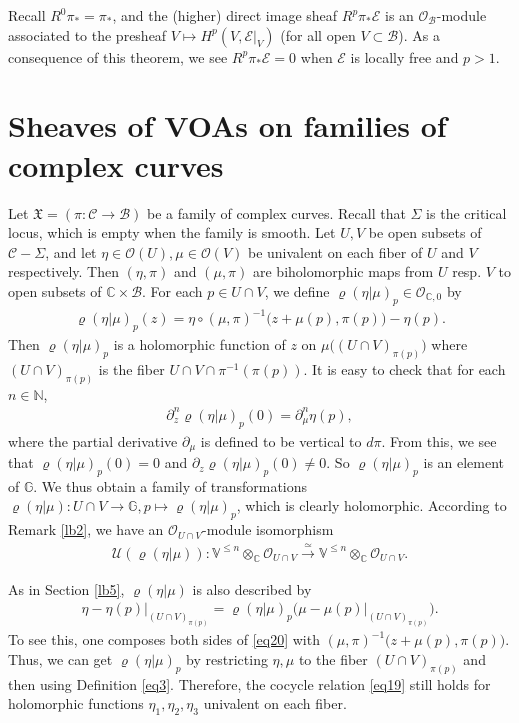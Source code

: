 \documentclass[11pt,b5paper,notitlepage]{article}
\theoremstyle{definition}
\theoremstyle{plain}
\newcommand{\fk}{\mathfrak}
\newcommand{\mc}{\mathcal}
\newcommand{\scr}{\mathscr}
\newcommand{\Vbb}{\mathbb V}
\newcommand{\Gbb}{\mathbb G}
\newcommand{\Cbb}{\mathbb C}
\newcommand{\Nbb}{\mathbb N}
\numberwithin{equation}{section}
\begin{document}
Recall  $R^0\pi_*=\pi_*$, and the (higher) direct image sheaf $R^p\pi_*\scr E$ is an $\scr O_{\mc B}$-module associated to the presheaf $V\mapsto H^p(V,\scr E|_V)$ (for all open $V\subset\mc B$). As a consequence of this theorem, we see $R^p\pi_*\scr E=0$ when $\scr E$ is locally free and $p>1$.



\section{Sheaves of VOAs on families of complex curves}\label{lb23}



Let $\fk X=(\pi:\mc C\rightarrow\mc B)$ be a family of complex curves. Recall that $\Sigma$ is the critical locus, which is empty when the family is smooth. Let $U,V$ be open subsets of $\mc C-\Sigma$, and let $\eta\in\scr O(U),\mu\in\scr O(V)$ be univalent on each fiber of $U$ and $V$ respectively. Then  $(\eta,\pi)$ and $(\mu,\pi)$ are biholomorphic maps from $U$ resp. $V$ to open subsets of $\Cbb\times\mc B$.   For each $p\in U\cap V$, we define $\varrho(\eta|\mu)_p\in\scr O_{\Cbb,0}$ by
\begin{align}
\varrho(\eta|\mu)_p(z)=\eta\circ(\mu,\pi)^{-1}\big(z+\mu(p),\pi(p)\big)-\eta(p).
\end{align}
Then $\varrho(\eta|\mu)_p$ is a holomorphic function of $z$ on  $\mu\big((U\cap V)_{\pi(p)}\big)$ where $(U\cap V)_{\pi(p)}$ is the fiber $U\cap V\cap \pi^{-1}(\pi(p))$. It is easy to check that for each $n\in\Nbb$,
\begin{align}
\partial_z^n\varrho(\eta|\mu)_p(0)=\partial_\mu^n \eta(p),
\end{align}
where the partial derivative $\partial_\mu$ is defined to be vertical to $d\pi$. From this, we see that $\varrho(\eta|\mu)_p(0)=0$ and  $\partial_z\varrho(\eta|\mu)_p(0)\neq0$. So $\varrho(\eta|\mu)_p$ is an element of $\Gbb$. We thus obtain a family of transformations $\varrho(\eta|\mu):U\cap V\rightarrow\Gbb,p\mapsto \varrho(\eta|\mu)_p$, which  is clearly holomorphic. According to Remark \ref{lb2},  we have an $\scr O_{U\cap V}$-module isomorphism
\begin{align*}
\mc U(\varrho(\eta|\mu)):\Vbb^{\leq n}\otimes_\Cbb\scr O_{U\cap V}\xrightarrow{\simeq} \Vbb^{\leq n}\otimes_\Cbb\scr O_{U\cap V}.
\end{align*}

As in Section \ref{lb5}, $\varrho(\eta|\mu)$ is also described by
\begin{align}
\eta-\eta(p)\big|_{(U\cap V)_{\pi(p)}}=\varrho(\eta|\mu)_p\big(\mu-\mu(p)\big|_{(U\cap V)_{\pi(p)}}\big).\label{eq20}
\end{align}
To see this, one composes both sides of \eqref{eq20} with $(\mu,\pi)^{-1}\big(z+\mu(p),\pi(p)\big)$.  Thus, we can get $\varrho(\eta|\mu)_p$ by restricting $\eta,\mu$ to the fiber $(U\cap V)_{\pi(p)}$ and then using Definition \eqref{eq3}. Therefore, the cocycle relation \eqref{eq19} still holds for holomorphic functions $\eta_1,\eta_2,\eta_3$ univalent on each fiber.
\end{document}

